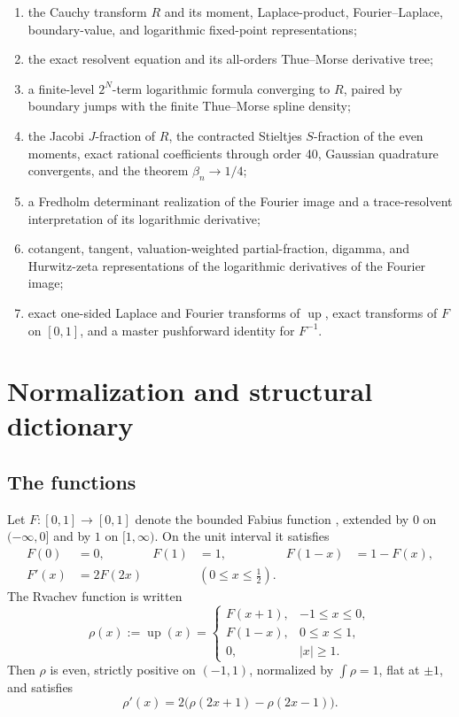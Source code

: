 \documentclass[11pt]{article}
\theoremstyle{definition}
\theoremstyle{remark}
\newcommand{\Up}{\operatorname{up}}
\begin{document}
\begin{enumerate}
\item the Cauchy transform \(R\) and its moment, Laplace-product, Fourier--Laplace,
      boundary-value, and logarithmic fixed-point representations;
\item the exact resolvent equation and its all-orders Thue--Morse derivative tree;
\item a finite-level \(2^N\)-term logarithmic formula converging to \(R\), paired by
      boundary jumps with the finite Thue--Morse spline density;
\item the Jacobi \(J\)-fraction of \(R\), the contracted Stieltjes \(S\)-fraction of the
      even moments, exact rational coefficients through order 40, Gaussian quadrature
      convergents, and the theorem \(\beta_n\to1/4\);
\item a Fredholm determinant realization of the Fourier image and a trace-resolvent
      interpretation of its logarithmic derivative;
\item cotangent, tangent, valuation-weighted partial-fraction, digamma, and Hurwitz-zeta
      representations of the logarithmic derivatives of the Fourier image;
\item exact one-sided Laplace and Fourier transforms of \(\Up\), exact transforms of
      \(F\) on \([0,1]\), and a master pushforward identity for \(F^{-1}\).
\end{enumerate}

\section{Normalization and structural dictionary}

\subsection{The functions}

Let \(F:[0,1]\to[0,1]\) denote the bounded Fabius function \cite{Fabius1966,AriasTranslation}, extended by \(0\) on
\(( -\infty,0]\) and by \(1\) on \([1,\infty)\).  On the unit interval it satisfies
\begin{align}
 F(0)&=0, & F(1)&=1, & F(1-x)&=1-F(x), \label{eq:F-symmetry}\\
 F'(x)&=2F(2x) &&(0\le x\le\tfrac12). \label{eq:F-diff}
\end{align}
The Rvachev function is written
\begin{equation}
 \rho(x):=\Up(x)=
 \begin{cases}
 F(x+1),&-1\le x\le0,\\
 F(1-x),&0\le x\le1,\\
 0,&|x|\ge1.
 \end{cases}                                                \label{eq:rho-fold}
\end{equation}
Then \(\rho\) is even, strictly positive on \((-1,1)\), normalized by
\(\int\rho=1\), flat at \(\pm1\), and satisfies
\begin{equation}
 \rho'(x)=2\bigl(\rho(2x+1)-\rho(2x-1)\bigr).                \label{eq:rho-dde}
\end{equation}
\end{document}
